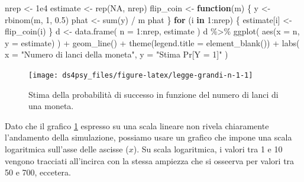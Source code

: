 \documentclass[
  11pt,
]{krantz}
\makeatletter
\newenvironment{Shaded}{\begin{snugshade}}{\end{snugshade}}
\newcommand{\AttributeTok}[1]{\textcolor[rgb]{0.61,0.61,0.61}{#1}}
\newcommand{\ConstantTok}[1]{\textcolor[rgb]{0,0,0}{#1}}
\newcommand{\ControlFlowTok}[1]{\textcolor[rgb]{0.27,0.27,0.27}{\textbf{#1}}}
\newcommand{\DecValTok}[1]{\textcolor[rgb]{0.06,0.06,0.06}{#1}}
\newcommand{\FloatTok}[1]{\textcolor[rgb]{0.06,0.06,0.06}{#1}}
\newcommand{\FunctionTok}[1]{\textcolor[rgb]{0,0,0}{#1}}
\newcommand{\NormalTok}[1]{#1}
\newcommand{\OtherTok}[1]{\textcolor[rgb]{0.37,0.37,0.37}{#1}}
\newcommand{\SpecialCharTok}[1]{\textcolor[rgb]{0,0,0}{#1}}
\newcommand{\StringTok}[1]{\textcolor[rgb]{0.5,0.5,0.5}{#1}}
\newenvironment{kframe}{%
\medskip{}
\setlength{\fboxsep}{.8em}
 \def\at@end@of@kframe{}%
 \ifinner\ifhmode%
  \def\at@end@of@kframe{\end{minipage}}%
  \begin{minipage}{\columnwidth}%
 \fi\fi%
 \def\FrameCommand##1{\hskip\@totalleftmargin \hskip-\fboxsep
 \colorbox{shadecolor}{##1}\hskip-\fboxsep
     \hskip-\linewidth \hskip-\@totalleftmargin \hskip\columnwidth}%
 \MakeFramed {\advance\hsize-\width
   \@totalleftmargin\z@ \linewidth\hsize
   \@setminipage}}%
 {\par\unskip\endMakeFramed%
 \at@end@of@kframe}
\renewenvironment{Shaded}{\begin{kframe}}{\end{kframe}}
\theoremstyle{definition}
\theoremstyle{definition}
\theoremstyle{definition}
\theoremstyle{definition}
\theoremstyle{remark}
\makeatother
\begin{document}
\begin{Shaded}
\begin{Highlighting}[]
\NormalTok{nrep }\OtherTok{\textless{}{-}} \FloatTok{1e4}
\NormalTok{estimate }\OtherTok{\textless{}{-}} \FunctionTok{rep}\NormalTok{(}\ConstantTok{NA}\NormalTok{, nrep)}
\NormalTok{flip\_coin }\OtherTok{\textless{}{-}} \ControlFlowTok{function}\NormalTok{(m) \{}
\NormalTok{  y }\OtherTok{\textless{}{-}} \FunctionTok{rbinom}\NormalTok{(m, }\DecValTok{1}\NormalTok{, }\FloatTok{0.5}\NormalTok{)}
\NormalTok{  phat }\OtherTok{\textless{}{-}} \FunctionTok{sum}\NormalTok{(y) }\SpecialCharTok{/}\NormalTok{ m}
\NormalTok{  phat}
\NormalTok{\}}
\ControlFlowTok{for}\NormalTok{ (i }\ControlFlowTok{in} \DecValTok{1}\SpecialCharTok{:}\NormalTok{nrep) \{}
\NormalTok{  estimate[i] }\OtherTok{\textless{}{-}} \FunctionTok{flip\_coin}\NormalTok{(i)}
\NormalTok{\}}
\NormalTok{d }\OtherTok{\textless{}{-}} \FunctionTok{data.frame}\NormalTok{(}
  \AttributeTok{n =} \DecValTok{1}\SpecialCharTok{:}\NormalTok{nrep,}
\NormalTok{  estimate}
\NormalTok{)}
\NormalTok{d }\SpecialCharTok{\%\textgreater{}\%}
  \FunctionTok{ggplot}\NormalTok{(}
    \FunctionTok{aes}\NormalTok{(}\AttributeTok{x =}\NormalTok{ n, }\AttributeTok{y =}\NormalTok{ estimate)}
\NormalTok{  ) }\SpecialCharTok{+}
  \FunctionTok{geom\_line}\NormalTok{() }\SpecialCharTok{+}
  \FunctionTok{theme}\NormalTok{(}\AttributeTok{legend.title =} \FunctionTok{element\_blank}\NormalTok{()) }\SpecialCharTok{+}
  \FunctionTok{labs}\NormalTok{(}
    \AttributeTok{x =} \StringTok{"Numero di lanci della moneta"}\NormalTok{,}
    \AttributeTok{y =} \StringTok{"Stima Pr[Y = 1]"}
\NormalTok{  )}
\end{Highlighting}
\end{Shaded}

\begin{figure}[h]

{\centering \texttt{[image: ds4psy\_files/figure-latex/legge-grandi-n-1-1]} 

}

\caption{Stima della probabilità di successo in funzione del numero di lanci di una moneta.}\label{fig:legge-grandi-n-1}
\end{figure}

Dato che il grafico \ref{fig:legge-grandi-n-1} espresso su una scala lineare non rivela chiaramente l'andamento della simulazione, possiamo usare un grafico che impone una scala logaritmica sull'asse delle ascisse (\(x\)). Su scala logaritmica, i valori tra 1 e 10 vengono tracciati all'incirca con la stessa ampiezza che si osseerva per valori tra 50 e 700, eccetera.
\end{document}
